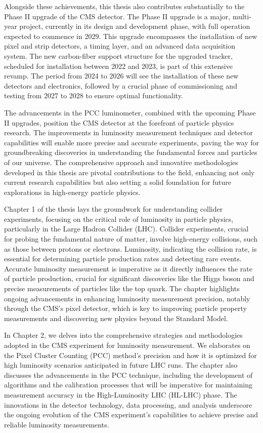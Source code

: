 Alongside these achievements, this thesis also contributes substantially to the Phase II upgrade of the CMS detector. The Phase II upgrade is a major, multi-year project, currently in its design and development phase, with full operation expected to commence in 2029. This upgrade encompasses the installation of new pixel and strip detectors, a timing layer, and an advanced data acquisition system. The new carbon-fiber support structure for the upgraded tracker, scheduled for installation between 2022 and 2023, is part of this extensive revamp. The period from 2024 to 2026 will see the installation of these new detectors and electronics, followed by a crucial phase of commissioning and testing from 2027 to 2028 to ensure optimal functionality.

The advancements in the PCC luminometer, combined with the upcoming Phase II upgrades, position the CMS detector at the forefront of particle physics research. The improvements in luminosity measurement techniques and detector capabilities will enable more precise and accurate experiments, paving the way for groundbreaking discoveries in understanding the fundamental forces and particles of our universe. The comprehensive approach and innovative methodologies developed in this thesis are pivotal contributions to the field, enhancing not only current research capabilities but also setting a solid foundation for future explorations in high-energy particle physics.

Chapter 1 of the thesis lays the groundwork for understanding collider experiments, focusing on the critical role of luminosity in particle physics, particularly in the Large Hadron Collider (LHC). Collider experiments, crucial for probing the fundamental nature of matter, involve high-energy collisions, such as those between protons or electrons. Luminosity, indicating the collision rate, is essential for determining particle production rates and detecting rare events. Accurate luminosity measurement is imperative as it directly influences the rate of particle production, crucial for significant discoveries like the Higgs boson and precise measurements of particles like the top quark. The chapter highlights ongoing advancements in enhancing luminosity measurement precision, notably through the CMS's pixel detector, which is key to improving particle property measurements and discovering new physics beyond the Standard Model.

In Chapter 2, we delves into the comprehensive strategies and methodologies adopted in the CMS experiment for luminosity measurement. We elaborates on the Pixel Cluster Counting (PCC) method's precision and how it is optimized for high luminosity scenarios anticipated in future LHC runs. The chapter also discusses the advancements in the PCC technique, including the development of algorithms and the calibration processes that will be imperative for maintaining measurement accuracy in the High-Luminosity LHC (HL-LHC) phase. The innovations in the detector technology, data processing, and analysis underscore the ongoing evolution of the CMS experiment's capabilities to achieve precise and reliable luminosity measurements.

